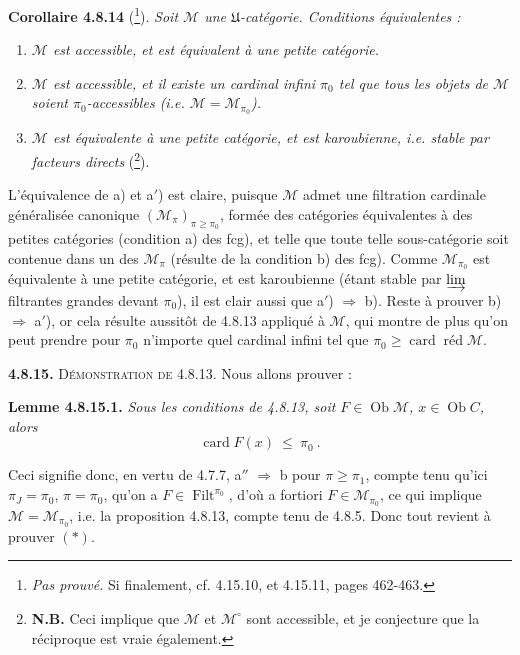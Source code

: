 \documentclass[11pt]{article}
\newcommand{\printedpage}[1]{\marginpar{\footnotesize p.~#1}}
\newcommand{\msp}[1]{\marginpar{\footnotesize [#1]}}
\newcommand{\Filt}{\operatorname{Filt}}
\newcommand{\card}{\operatorname{card}}
\newcommand{\Ob}{\operatorname{Ob}}
\newcommand{\red}{\operatorname{\text{réd}}}
\newcommand{\cM}{\mathcal{M}}
\begin{document}
\textbf{Corollaire 4.8.14} (\footnote[90]{\textit{Pas prouvé.} Si finalement, cf. 4.15.10, et 4.15.11, pages 462-463.}). \textit{Soit $\cM$ une $\mathfrak{U}$-catégorie. Conditions équivalentes :}
\begin{enumerate}[leftmargin=*]
\item[\textit{a)}] \textit{$\cM$ est accessible, et est équivalent à une petite catégorie.}
\item[\textit{a$'$)}] \textit{$\cM$ est accessible, et il existe un cardinal infini $\pi_0$ tel que tous les objets de $\cM$ soient $\pi_0$-accessibles (i.e. $\cM = \cM_{\pi_0}$).}
\item[\textit{b)}] \textit{$\cM$ est équivalente à une petite catégorie, et est karoubienne, i.e. stable par facteurs directs} (\footnote[91]{\textbf{N.B.} Ceci implique que $\cM$ et $\cM^{\circ}$ sont accessible, et je conjecture que la réciproque est vraie également.}). %
\end{enumerate}

L'équivalence de a) et a$'$) est claire, puisque $\cM$ admet une filtration cardinale généralisée canonique $(\cM_{\pi})_{\pi\geqslant\pi_0}$, formée des catégories équivalentes à des petites catégories (condition
\printedpage{76}
a) des fcg), et telle que toute telle sous-catégorie soit contenue dans un des $\cM_{\pi}$ (résulte de la condition b) des fcg). Comme $\cM_{\pi_0}$ est équivalente à une petite catégorie, et est karoubienne (étant stable par $\varinjlim$ filtrantes grandes devant $\pi_0$), il est clair aussi que a$'$) $\Longrightarrow$ b). Reste à prouver b) $\Longrightarrow$ a$'$), or cela résulte aussitôt de 4.8.13 appliqué à $\cM$, qui montre de plus qu'on peut prendre pour $\pi_0$ n'importe quel cardinal infini tel que $\pi_0 \geqslant \card\red\cM$.

\msp{page 214}

\textbf{4.8.15.} \textsc{Démonstration de} 4.8.13. Nous allons prouver :

\textbf{Lemme 4.8.15.1.} \textit{Sous les conditions de 4.8.13, soit $F \in \Ob\cM$, $x \in \Ob C$, alors}
\[
\card F(x) \ \leqslant\ \pi_0\ . \tag*{$(*)$}
\]

Ceci signifie donc, en vertu de 4.7.7, a$''$ $\Longrightarrow$ b pour $\pi \geqslant \pi_1$, compte tenu qu'ici $\pi_J = \pi_0$, $\pi = \pi_0$, qu'on a $F \in \Filt^{\pi_0}$, d'où a fortiori $F \in \cM_{\pi_0}$, ce qui implique $\cM = \cM_{\pi_0}$, i.e. la proposition 4.8.13, compte tenu de 4.8.5. Donc tout revient à prouver $(*)$.
\end{document}
